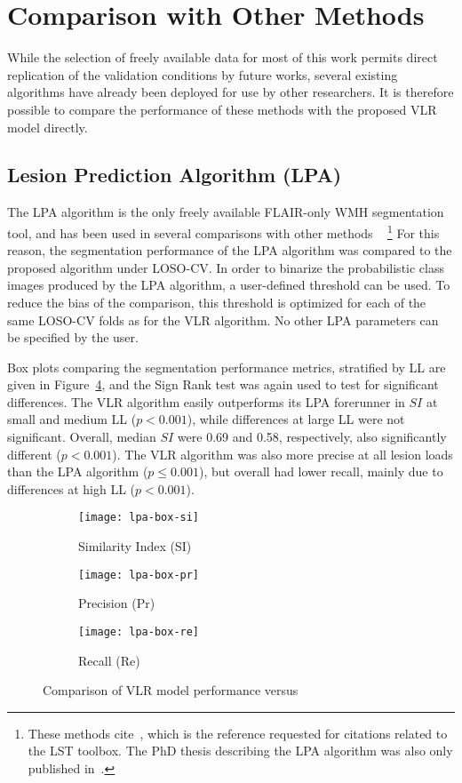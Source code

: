\section{Comparison with Other Methods}
While the selection of freely available data for most of this work
permits direct replication of the validation conditions by future works,
several existing algorithms have already been deployed for use by other researchers.
It is therefore possible to compare the performance of these methods with
the proposed VLR model directly.
\subsection{Lesion Prediction Algorithm (LPA)}\label{ss:exp-lpa}
The LPA algorithm is the only freely available FLAIR-only WMH segmentation tool,
and has been used in several comparisons with other methods%
~\cite{Griffanti2016,Brosch2016,Egger2017}%
\footnote{These methods cite~\cite{Schmidt2012},
  which is the reference requested for citations related to the LST toolbox.
  The PhD thesis describing the LPA algorithm was also only published in~\citeyear{Schmidt2017}.}
For this reason, the segmentation performance of the LPA algorithm
was compared to the proposed algorithm under LOSO-CV.
In order to binarize the probabilistic class images produced by the LPA algorithm,
a user-defined threshold can be used.
To reduce the bias of the comparison,
this threshold is optimized for each of the same LOSO-CV folds as for the VLR algorithm.
No other LPA parameters can be specified by the user.
\par
Box plots comparing the segmentation performance metrics, stratified by LL
are given in Figure~\ref{fig:seg-lpa}, and
the Sign Rank test was again used to test for significant differences.
The VLR algorithm easily outperforms its LPA forerunner
in $SI$ at small and medium LL ($p < 0.001$),
while differences at large LL were not significant.
Overall, median $SI$ were 0.69 and 0.58, respectively, also significantly different ($p < 0.001$).
The VLR algorithm was also more precise at all lesion loads than the LPA algorithm ($p \le 0.001$),
but overall had lower recall, mainly due to differences at high LL ($p < 0.001$).
\par
\begin{figure}
  \centering
  \begin{subfigure}{0.32\textwidth}
    \centering
    \texttt{[image: lpa-box-si]}
    \caption{Similarity Index (SI)}%
    \label{fig:seg-lpa-si}
  \end{subfigure}
  \begin{subfigure}{0.32\textwidth}
    \centering
    \texttt{[image: lpa-box-pr]}
    \caption{Precision (Pr)}%
    \label{fig:seg-lpa-pr}
  \end{subfigure}
  \begin{subfigure}{0.32\textwidth}
    \centering
    \texttt{[image: lpa-box-re]}
    \caption{Recall (Re)}%
    \label{fig:seg-lpa-re}
  \end{subfigure}
  \caption{Comparison of VLR model performance versus }%
  \label{fig:seg-lpa}
\end{figure}
